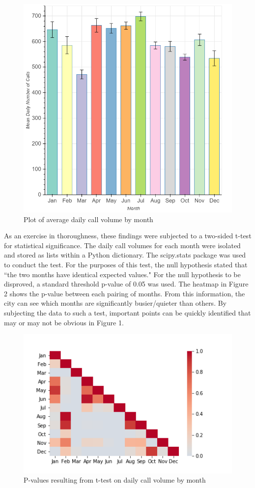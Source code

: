 \documentclass[11pt,twocolumn]{article}
\begin{document}
\begin{figure}[h]
  \includegraphics[scale=.27]{month_bar.png}
  \caption{Plot of average daily call volume by month}
\end{figure}

As an exercise in thoroughness, these findings were subjected to a two-sided t-test for statistical significance.  The daily call volumes for each month were isolated and stored as lists within a Python dictionary.  The scipy.stats package was used to conduct the test.  For the purposes of this test, the null hypothesis stated that ``the two months have identical expected values."  For the null hypothesis to be disproved, a standard threshold p-value of 0.05 was used.  The heatmap in Figure 2 shows the p-value between each pairing of months.  From this information, the city can see which months are significantly busier/quieter than others.  By subjecting the data to such a test, important points can be quickly identified that may or may not be obvious in Figure 1.

\begin{figure}[h]
	\includegraphics[scale=.65]{Heatmap.png}
	\caption{P-values resulting from t-test on daily call volume by month}
\end{figure}
\end{document}
